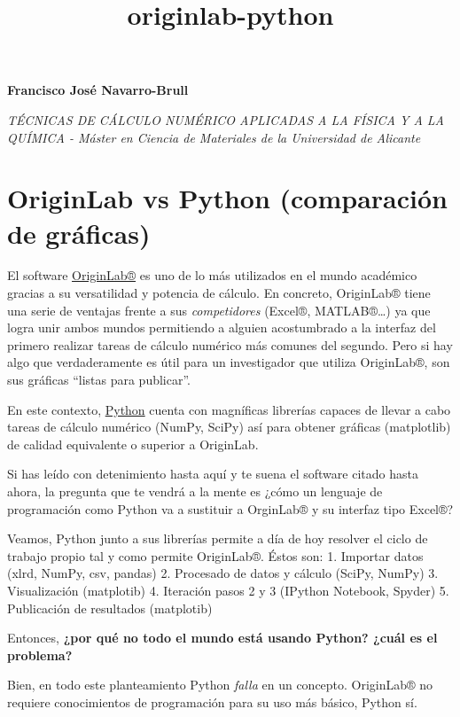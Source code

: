 \documentclass{article}
\title{originlab-python}
\begin{document}
    
    
    \maketitle
    
    

    
    \textbf{Francisco José Navarro-Brull}

    \emph{TÉCNICAS DE CÁLCULO NUMÉRICO APLICADAS A LA FÍSICA Y A LA QUÍMICA
- Máster en Ciencia de Materiales de la Universidad de Alicante}


    \section{OriginLab vs Python (comparación de gráficas)}


    El software \href{http://www.originlab.com/}{OriginLab®} es uno de lo
más utilizados en el mundo académico gracias a su versatilidad y
potencia de cálculo. En concreto, OriginLab® tiene una serie de ventajas
frente a sus \emph{competidores} (Excel®, MATLAB®\ldots{}) ya que logra
unir ambos mundos permitiendo a alguien acostumbrado a la interfaz del
primero realizar tareas de cálculo numérico más comunes del segundo.
Pero si hay algo que verdaderamente es útil para un investigador que
utiliza OriginLab®, son sus gráficas ``listas para publicar''.

En este contexto, \href{https://www.python.org/}{Python} cuenta con
magníficas librerías capaces de llevar a cabo tareas de cálculo numérico
(NumPy, SciPy) así para obtener gráficas (matplotlib) de calidad
equivalente o superior a OriginLab.

Si has leído con detenimiento hasta aquí y te suena el software citado
hasta ahora, la pregunta que te vendrá a la mente es ¿cómo un lenguaje
de programación como Python va a sustituir a OrginLab® y su interfaz
tipo Excel®?

Veamos, Python junto a sus librerías permite a día de hoy resolver el
ciclo de trabajo propio tal y como permite OriginLab®. Éstos son: 1.
Importar datos (xlrd, NumPy, csv, pandas) 2. Procesado de datos y
cálculo (SciPy, NumPy) 3. Visualización (matplotib) 4. Iteración pasos 2
y 3 (IPython Notebook, Spyder) 5. Publicación de resultados (matplotib)

    Entonces, \textbf{¿por qué no todo el mundo está usando Python? ¿cuál es
el problema?}

Bien, en todo este planteamiento Python \emph{falla} en un concepto.
OriginLab® no requiere conocimientos de programación para su uso más
básico, Python sí.
\end{document}
